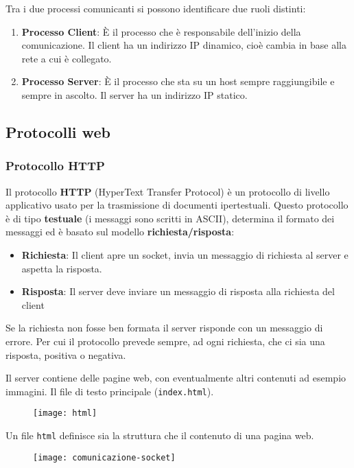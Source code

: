 \documentclass[a4paper]{article}
\begin{document}
\noindent
Tra i due processi comunicanti si possono identificare due ruoli distinti:
\begin{enumerate}
  \item \textbf{Processo Client}: È il processo che è responsabile dell'inizio della
    comunicazione. Il client ha un indirizzo IP dinamico, cioè cambia in base alla
    rete a cui è collegato.

  \item \textbf{Processo Server}: È il processo che sta su un host sempre raggiungibile
    e sempre in ascolto. Il server ha un indirizzo IP statico.
\end{enumerate}

\subsection{Protocolli web}
\subsubsection{Protocollo HTTP}
Il protocollo \textbf{HTTP} (HyperText Transfer Protocol) è un protocollo di livello
applicativo usato per la trasmissione di documenti ipertestuali. Questo protocollo
è di tipo \textbf{testuale} (i messaggi sono scritti in ASCII),
determina il formato dei messaggi ed è basato sul modello \textbf{richiesta/risposta}:
\begin{itemize}
  \item \textbf{Richiesta}: Il client apre un socket, invia un messaggio di richiesta
    al server e aspetta la risposta.
  \item \textbf{Risposta}: Il server deve inviare un messaggio di risposta alla richiesta 
    del client
\end{itemize}
Se la richiesta non fosse ben formata il server risponde con un messaggio di errore.
Per cui il protocollo prevede sempre, ad ogni richiesta, che ci sia una risposta, positiva
o negativa.

Il server contiene delle pagine web, con eventualmente altri contenuti ad esempio immagini.
Il file di testo principale (\texttt{index.html}).
\begin{figure}[H]
  \centering
  \texttt{[image: html]}
\end{figure}
\noindent
Un file \texttt{html} definisce sia la struttura che il contenuto di una pagina web.
\begin{figure}[H]
  \centering
  \texttt{[image: comunicazione-socket]}
\end{figure}
\end{document}
